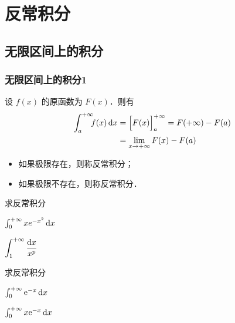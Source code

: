 \documentclass[14pt,notheorems,leqno,xcolor={rgb}]{beamer} %
\begin{document}
\section{反常积分}


\subsection{无限区间上的积分}

\begin{frame}
\frametitle{无限区间上的积分1}
设 $f(x)$ 的原函数为 $F(x)$．则有
\begin{align*}
\int_a^{+\infty}\hspace{-.5em}f(x)\mathop{}\!\mathrm{d} x &= \Big[F(x)\Big]^{+\infty}_a=F(+\infty)-F(a)\\
                       &=\lim\limits_{x\to+\infty}F(x)-F(a)
\end{align*}
\pause\vspace{-1em}
\begin{itemize}
  \item 如果极限存在，则称反常积分；
  \item 如果极限不存在，则称反常积分．
\end{itemize}
\end{frame}

\begin{frame}
\begin{example}求反常积分
\begin{enumlite}
  \item $\int_0^{+\infty} xe^{-x^2}\mathop{}\!\mathrm{d} x$\pause
  \item $\displaystyle\int_1^{+\infty}\frac{\mathop{}\!\mathrm{d} x}{x^p}$
\end{enumlite}
\end{example}
\end{frame}

\begin{frame}
\begin{exercise}求反常积分
\begin{enumlite}
  \item $\int_0^{+\infty} \mathrm{e}^{-x}\mathop{}\!\mathrm{d}{x}$\pause
  \item $\int_0^{+\infty} x\mathrm{e}^{-x}\mathop{}\!\mathrm{d}{x}$
\end{enumlite}
\end{exercise}
\end{frame}
\end{document}
